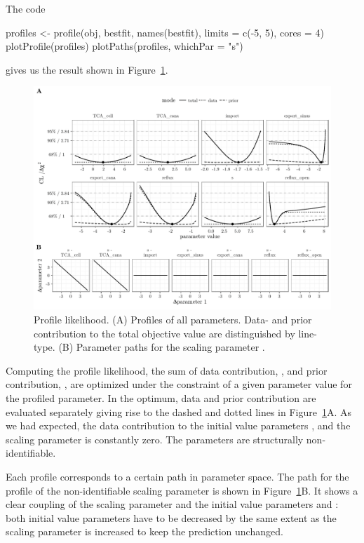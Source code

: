 \documentclass[article]{jss}
\begin{document}
The code
\begin{CodeChunk}
\begin{CodeInput}
profiles <- profile(obj, bestfit, names(bestfit), limits = c(-5, 5), cores = 4)
plotProfile(profiles)
plotPaths(profiles, whichPar = "s")
\end{CodeInput}
\end{CodeChunk}
gives us the result shown in Figure~\ref{fig:pl}.
\begin{figure}[ht]
	\centering
	\includegraphics[width = \textwidth]{images/figure7}
	\caption{Profile likelihood. (A) Profiles of all parameters. Data- and prior contribution to the total objective value are distinguished by line-type. (B) Parameter paths for the scaling parameter .}
	\label{fig:pl}
\end{figure}
Computing the profile likelihood, the sum of data contribution, , and prior contribution, , are optimized under the constraint of a given parameter value for the profiled parameter. In the optimum, data and prior contribution are evaluated separately giving rise to the dashed and dotted lines in Figure~\ref{fig:pl}A. As we had expected, the data contribution to the initial value parameters ,  and the scaling parameter  is constantly zero. The parameters are structurally non-identifiable.

Each profile corresponds to a certain path in parameter space. The path for the profile of the non-identifiable scaling parameter  is shown in Figure~\ref{fig:pl}B. It shows a clear coupling of the scaling parameter  and the initial value parameters  and : both initial value parameters have to be decreased by the same extent as the scaling parameter is increased to keep the prediction unchanged.
\end{document}
